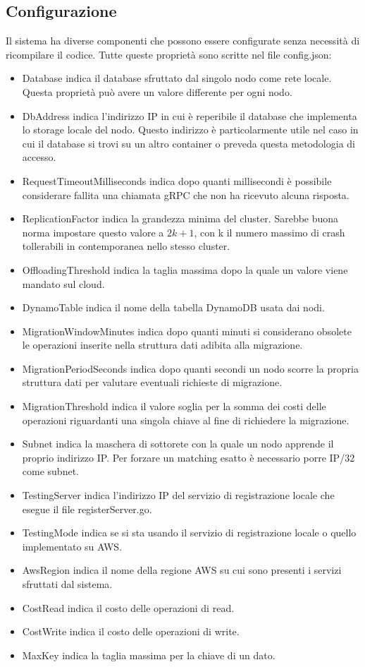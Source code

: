 \documentclass[conference]{IEEEtran}
\begin{document}
\subsection{Configurazione}
Il sistema ha diverse componenti che possono essere configurate senza necessità di ricompilare il codice. Tutte queste
proprietà sono scritte nel file config.json:
\begin{itemize}
  \item {Database} indica il database sfruttato dal singolo nodo come rete locale. Questa proprietà può avere un valore
differente per ogni nodo.
  \item {DbAddress} indica l'indirizzo IP in cui è reperibile il database che implementa lo storage locale del nodo.
Questo indirizzo è particolarmente utile nel caso in cui il database si trovi su un altro container o preveda questa metodologia
di accesso.
  \item {RequestTimeoutMilliseconds} indica dopo quanti millisecondi è possibile considerare fallita una chiamata gRPC che non
ha ricevuto alcuna risposta.
  \item {ReplicationFactor} indica la grandezza minima del cluster. Sarebbe buona norma impostare questo valore a \(2k + 1\),
con k il numero massimo di crash tollerabili in contemporanea nello stesso cluster.
  \item {OffloadingThreshold} indica la taglia massima dopo la quale un valore viene mandato sul cloud.
  \item {DynamoTable} indica il nome della tabella DynamoDB usata dai nodi.
  \item {MigrationWindowMinutes} indica dopo quanti minuti si considerano obsolete le operazioni inserite nella struttura dati
adibita alla migrazione.
  \item {MigrationPeriodSeconds} indica dopo quanti secondi un nodo scorre la propria struttura dati per valutare eventuali
richieste di migrazione.
  \item {MigrationThreshold} indica il valore soglia per la somma dei costi delle operazioni riguardanti una singola chiave
al fine di richiedere la migrazione.
  \item {Subnet} indica la maschera di sottorete con la quale un nodo apprende il proprio indirizzo IP. Per forzare un
matching esatto è necessario porre IP/32 come subnet.
  \item {TestingServer} indica l'indirizzo IP del servizio di registrazione locale che esegue il file registerServer.go.
  \item {TestingMode} indica se si sta usando il servizio di registrazione locale o quello implementato su AWS.
  \item {AwsRegion} indica il nome della regione AWS su cui sono presenti i servizi sfruttati dal sistema.
  \item {CostRead} indica il costo delle operazioni di read.
  \item {CostWrite} indica il costo delle operazioni di write.
  \item {MaxKey} indica la taglia massima per la chiave di un dato.
\end{itemize}
\end{document}
